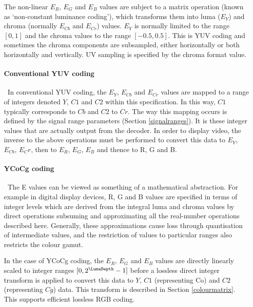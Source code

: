 \begin{informative*}
The non-linear $E_R$, $E_G$ and $E_B$ values are subject to a matrix operation
(known as `non-constant luminance coding'), which transforms
them into luma ($E_Y$) and chroma (normally $E_{Cb}$ and $E_{Cr}$) values. 
$E_Y$ is normally limited to the 
range $[0,1]$ and the chroma
values to the range $[-0.5, 0.5]$. This is YUV coding and
sometimes the chroma components are subsampled, either horizontally or
both horizontally and vertically. UV sampling is specified by the
chroma format value. 

\paragraph{Conventional YUV coding}
$\ $\newline
In conventional YUV coding, the $E_Y$, $E_{Cb}$ and $E_{Cr}$ values are
mapped to a range of integers denoted $Y$, $C1$ and $C2$ within this
specification. In this way, $C1$ typically corresponds to $Cb$ and
$C2$ to $Cr$. The way this mapping occurs is defined by the signal
range parameters (Section \ref{signalranges}). It is these integer values 
that are actually output from the decoder. In order to display video, the inverse to the above
operations must be performed to convert this data to $E_Y$, $E_{Cb}$, $E_Cr$, then
to $E_R$, $E_G$, $E_B$ and thence to R, G and B.  

\paragraph{YCoCg coding}
$\ $\newline
The E values can be viewed as something of a mathematical abstraction.
For example in digital display devices, R, G and B values are specified
in terms of integer levels which are derived from the integral luma and
chroma values by direct operations subsuming and approximating all the
real-number operations described here. Generally, these approximations
cause loss through quantisation of intermediate values, and the
restriction of values to particular ranges also restricts the colour
gamut. 

In the case of YCoCg coding, the $E_R$, $E_G$ and $E_B$ values are directly
linearly scaled to integer ranges $[0,2^\LumaDepth-1]$ before a lossless 
direct integer transform is applied to convert this data to $Y$, $C1$ (representing
Co) and $C2$ (representing $Cg$) data. This transform is described in Section
\ref{colourmatrix}. This supports efficient lossless RGB coding.


\end{informative*}

